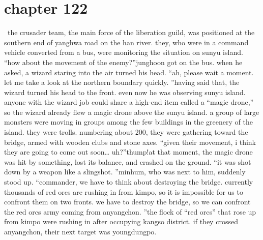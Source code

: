 \section{chapter 122}






 the crusader team, the main force of the liberation guild, was positioned at the southern end of yanghwa road on the han river.
 they, who were in a command vehicle converted from a bus, were monitoring the situation on sunyu island.
“how about the movement of the enemy?”junghoon got on the bus.
 when he asked, a wizard staring into the air turned his head.
“ah, please wait a moment.
 let me take a look at the northern boundary quickly.
”having said that, the wizard turned his head to the front.
 even now he was observing sunyu island.
anyone with the wizard job could share a high-end item called a “magic drone,” so the wizard already flew a magic drone above the sunyu island.
a group of large monsters were moving in groups among the few buildings in the greenery of the island.
they were trolls.
 numbering about 200, they were gathering toward the bridge, armed with wooden clubs and stone axes.
“given their movement, i think they are going to come out soon… uh?”thump!at that moment, the magic drone was hit by something, lost its balance, and crashed on the ground.
“it was shot down by a weapon like a slingshot.
”minhum, who was next to him, suddenly stood up.
“commander, we have to think about destroying the bridge.
 currently thousands of red orcs are rushing in from kimpo, so it is impossible for us to confront them on two fronts.
 we have to destroy the bridge, so we can confront the red orcs army coming from anyangchon.
”the flock of “red orcs” that rose up from kimpo were rushing in after occupying kangso district.
 if they crossed anyangchon, their next target was youngdungpo.

